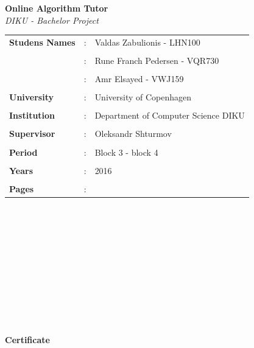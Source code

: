 \documentclass[11pt]{article}
\begin{document}
\clearpage\maketitle
\thispagestyle{empty}
\newpage
\begin{center}{\huge\textbf{Online Algorithm Tutor}}\newline \textit{\\DIKU - Bachelor Project}\end{center}
\hfill \break
\begin{tabular}{l l l }
\textbf{Studens Names} &: &Valdas Zabulionis - LHN100\\\\
&: &Rune Franch Pedersen - VQR730\\\\
&: &Amr Elsayed - VWJ159\\\\
\textbf{University} &:& University of Copenhagen\\\\
\textbf{Institution} &:& Department of Computer Science DIKU\\\\
\textbf{Supervisor} &:& Oleksandr Shturmov\\\\
\textbf{Period} &:& Block 3 - block 4\\\\
\textbf{Years} &:& 2016\\\\
\textbf{Pages} &:& \\
\end{tabular}
\\\\\\\\\\\\\\\\\\\\
\begin{center}{\huge\textbf{Certificate}}\end{center}
\end{document}
